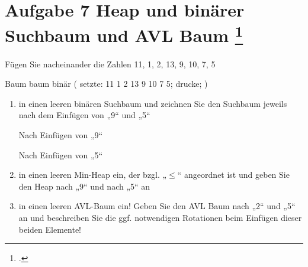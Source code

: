 \documentclass{lehramt-informatik-aufgabe}
\begin{document}
\section{Aufgabe 7 Heap und binärer Suchbaum und AVL Baum
\footcite{46115:2014:03}}

Fügen Sie nacheinander die Zahlen 11, 1, 2, 13, 9, 10, 7, 5

\begin{liProjektSprache}{Baum}
baum binär (
  setzte: 11 1 2 13 9 10 7 5;
  drucke;
)
\end{liProjektSprache}

\begin{enumerate}


\item in einen leeren binären Suchbaum und zeichnen Sie den Suchbaum
jeweils nach dem Einfügen von „9“ und „5“

\begin{liDiagramm}{Nach Einfügen von „9“}
\end{liDiagramm}

\begin{liDiagramm}{Nach Einfügen von „5“}
\end{liDiagramm}


\item in einen leeren Min-Heap ein, der bzgl. „$\leq$“ angeordnet ist und
geben Sie den Heap nach „9“ und nach „5“ an


\item in einen leeren AVL-Baum ein! Geben Sie den AVL Baum nach „2“ und
„5“ an und beschreiben Sie die ggf. notwendigen Rotationen beim Einfügen
dieser beiden Elemente!
\end{enumerate}
\end{document}
